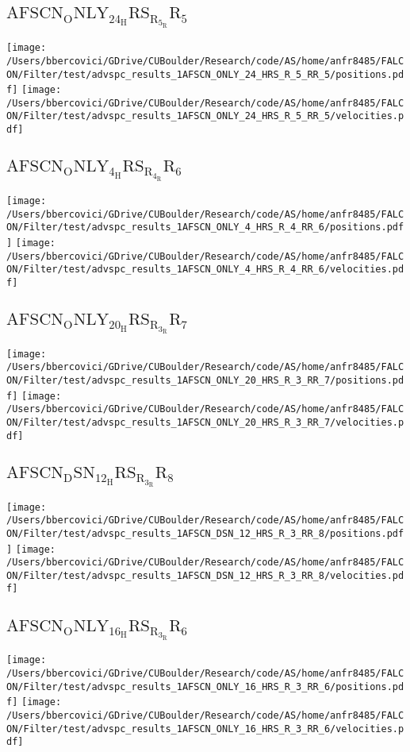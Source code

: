\subsection{$\mathrm{AFSCN_ONLY_24_HRS_R_5_RR_5}$}
\texttt{[image: /Users/bbercovici/GDrive/CUBoulder/Research/code/AS/home/anfr8485/FALCON/Filter/test/advspc\_results\_1AFSCN\_ONLY\_24\_HRS\_R\_5\_RR\_5/positions.pdf]}
\texttt{[image: /Users/bbercovici/GDrive/CUBoulder/Research/code/AS/home/anfr8485/FALCON/Filter/test/advspc\_results\_1AFSCN\_ONLY\_24\_HRS\_R\_5\_RR\_5/velocities.pdf]}
\subsection{$\mathrm{AFSCN_ONLY_4_HRS_R_4_RR_6}$}
\texttt{[image: /Users/bbercovici/GDrive/CUBoulder/Research/code/AS/home/anfr8485/FALCON/Filter/test/advspc\_results\_1AFSCN\_ONLY\_4\_HRS\_R\_4\_RR\_6/positions.pdf]}
\texttt{[image: /Users/bbercovici/GDrive/CUBoulder/Research/code/AS/home/anfr8485/FALCON/Filter/test/advspc\_results\_1AFSCN\_ONLY\_4\_HRS\_R\_4\_RR\_6/velocities.pdf]}
\subsection{$\mathrm{AFSCN_ONLY_20_HRS_R_3_RR_7}$}
\texttt{[image: /Users/bbercovici/GDrive/CUBoulder/Research/code/AS/home/anfr8485/FALCON/Filter/test/advspc\_results\_1AFSCN\_ONLY\_20\_HRS\_R\_3\_RR\_7/positions.pdf]}
\texttt{[image: /Users/bbercovici/GDrive/CUBoulder/Research/code/AS/home/anfr8485/FALCON/Filter/test/advspc\_results\_1AFSCN\_ONLY\_20\_HRS\_R\_3\_RR\_7/velocities.pdf]}
\subsection{$\mathrm{AFSCN_DSN_12_HRS_R_3_RR_8}$}
\texttt{[image: /Users/bbercovici/GDrive/CUBoulder/Research/code/AS/home/anfr8485/FALCON/Filter/test/advspc\_results\_1AFSCN\_DSN\_12\_HRS\_R\_3\_RR\_8/positions.pdf]}
\texttt{[image: /Users/bbercovici/GDrive/CUBoulder/Research/code/AS/home/anfr8485/FALCON/Filter/test/advspc\_results\_1AFSCN\_DSN\_12\_HRS\_R\_3\_RR\_8/velocities.pdf]}
\subsection{$\mathrm{AFSCN_ONLY_16_HRS_R_3_RR_6}$}
\texttt{[image: /Users/bbercovici/GDrive/CUBoulder/Research/code/AS/home/anfr8485/FALCON/Filter/test/advspc\_results\_1AFSCN\_ONLY\_16\_HRS\_R\_3\_RR\_6/positions.pdf]}
\texttt{[image: /Users/bbercovici/GDrive/CUBoulder/Research/code/AS/home/anfr8485/FALCON/Filter/test/advspc\_results\_1AFSCN\_ONLY\_16\_HRS\_R\_3\_RR\_6/velocities.pdf]}
